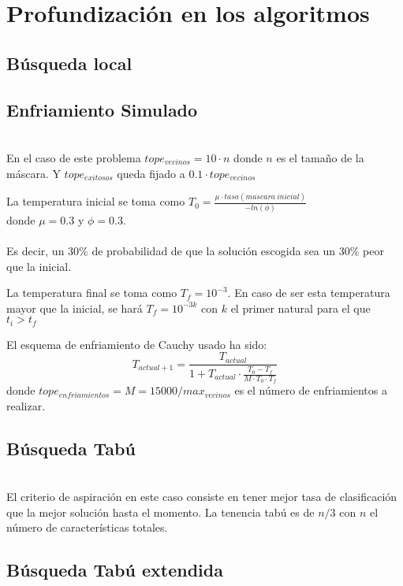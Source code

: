 \documentclass[a4paper,11pt]{article}
\begin{document}
\section{Profundización en los algoritmos}
\subsection{Búsqueda local}

\small{\texttt{}}
\normalsize

\subsection{Enfriamiento Simulado}

\small{\texttt{}}
\normalsize\\

En el caso de este problema $tope_{vecinos} = 10\cdot n$ donde $n$ es el tamaño de la máscara.
Y $tope_{exitosos}$ queda fijado a  $0.1\cdot tope_{vecinos}$

La temperatura inicial se toma como $T_{0}=\frac{\mu \cdot tasa(mascara\:inicial)}{-ln(\phi)}$
\\donde $\mu = 0.3$ y $\phi=0.3$. 
\ \\ \ \\
Es decir, un 30\% de probabilidad de que la solución escogida sea
un 30\% peor que la inicial.

La temperatura final se toma como $T_f = 10^{-3}$. En caso de ser esta temperatura mayor que la inicial,
se hará $T_f = 10^{-3k}$ con $k$ el primer natural para el que $t_i > t_f$

El esquema de enfriamiento de Cauchy usado ha sido: 
$$T_{actual+1} = \frac{T_{actual}}{1+T_{actual}\cdot \frac{T_0 - T_f}{M\cdot T_0\cdot T_f}}$$
donde $tope_{enfriamientos}=M = 15000/max_{vecinos}$ es el número de enfriamientos a realizar.  

\subsection{Búsqueda Tabú}

\small{\texttt{}}
\normalsize\\

El criterio de aspiración en este caso consiste en tener mejor tasa de clasificación que la mejor
solución hasta el momento. La tenencia tabú es de $n/3$ con $n$ el número de características totales.

\subsection{Búsqueda Tabú extendida}
\end{document}
